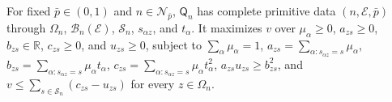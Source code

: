 For fixed \(\bar p\in(0,1)\) and \(n\in\mathcal N_{\bar p}\), \(\mathsf Q_n\) has complete primitive data \((n,\mathcal E,\bar p)\) through \(\Omega_n\), \(\mathcal B_n(\mathcal E)\), \(\mathcal S_n\), \(s_{\alpha z}\), and \(t_\alpha\). It maximizes \(v\) over \(\mu_\alpha\ge0\), \(a_{zs}\ge0\), \(b_{zs}\in\mathbb R\), \(c_{zs}\ge0\), and \(u_{zs}\ge0\), subject to \(\sum_\alpha\mu_\alpha=1\), \(a_{zs}=\sum_{\alpha:s_{\alpha z}=s}\mu_\alpha\), \(b_{zs}=\sum_{\alpha:s_{\alpha z}=s}\mu_\alpha t_\alpha\), \(c_{zs}=\sum_{\alpha:s_{\alpha z}=s}\mu_\alpha t_\alpha^2\), \(a_{zs}u_{zs}\ge b_{zs}^2\), and \(v\le\sum_{s\in\mathcal S_n}(c_{zs}-u_{zs})\) for every \(z\in\Omega_n\).